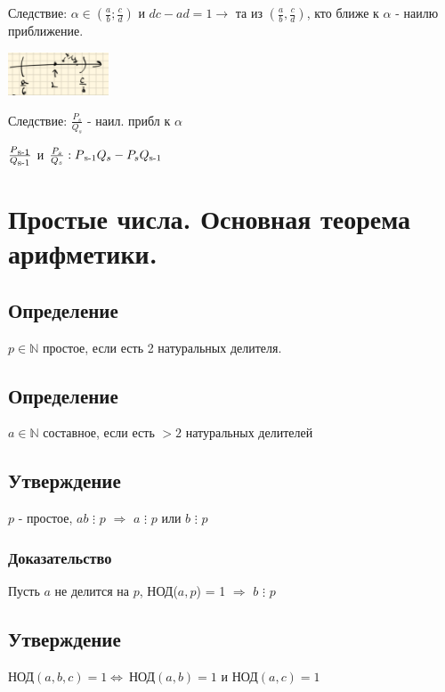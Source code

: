 \documentclass[12pt]{article}
\renewcommand{\gcd}{\text{НОД}}
\begin{document}
            Следствие: $\alpha \in (\frac{a}{b};\frac{c}{d})$ и $dc - ad = 1 \rightarrow$ та из $(\frac{a}{b}, \frac{c}{d})$, кто ближе к $\alpha$ - наилю приближение.

            \includegraphics[width=30mm]{image3.png}

            Следствие: $\frac{P_s}{Q_s} $ - наил. прибл к $\alpha$

$\frac{P\textsubscript{s-1}}{Q\textsubscript{s-1}}$ и $\frac{P_s}{Q_s} : P\textsubscript{s-1} Q_s - P_s Q\textsubscript{s-1}$

            \section{Простые числа. Основная теорема арифметики.}
            \subsection{Определение}
        $p \in \mathbb{N}$ простое, если есть 2 натуральных делителя.
            \subsection{Определение}
        $a \in \mathbb{N}$ составное, если есть $>2$ натуральных делителей
            \subsection{Утверждение}
        $p$ - простое, $ab$ $\vdots$ $p$ $\Rightarrow$ $a$ $\vdots$ $p$ или $b$ $\vdots$ $p$
            \subsubsection{Доказательство}
            Пусть $a$ не делится на $p$, НОД($a, p$) = 1 $\Rightarrow$ $b$ $\vdots$ $p$
            \subsection{Утверждение}
        $\gcd(a, b, c) = 1 \Leftrightarrow \ \gcd(a, b) = 1$ и $\gcd(a, c) = 1$
\end{document}
